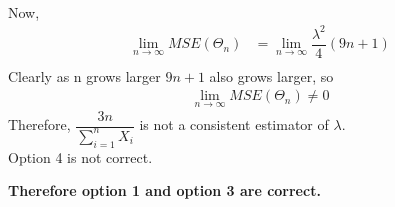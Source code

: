 \begin{enumerate}
\begin{align}
    \end{align}
    Now,
    \begin{align}
         \lim_{n\to\infty} MSE( \Theta_n) &=    \lim_{n\to\infty} \dfrac{ \lambda^2}{4 } (9n+1) \\
    \end{align}
    Clearly as n grows larger $ 9n+1$ also grows larger, so
    \begin{align}
         \lim_{n\to\infty} MSE( \Theta_n) \neq 0   
    \end{align}
    Therefore, $\dfrac{3n}{\sum_{i=1}^{n} X_i} $ is not a consistent estimator of $ \lambda$. \\
    Option 4 is not correct. \\
    \end{enumerate}
    \textbf{Therefore option 1 and option 3 are correct.}